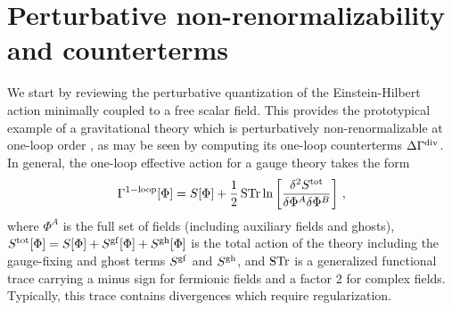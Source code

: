 \documentclass[preprint,preprintnumbers,amsmath,amssymb,nofootinbib,APS]{revtex4}
\newcommand{\be}{\begin{equation}}
\newcommand{\ee}{\end{equation}}
\newcommand{\2}{\sqrt{2\,}}
\begin{document}
\section{Perturbative non-renormalizability and counterterms}
\label{sec:pert}
We start by reviewing the perturbative quantization of the Einstein-Hilbert action minimally coupled to a free scalar field. This provides the prototypical example of a gravitational theory which is perturbatively non-renormalizable at one-loop order \cite{'tHooft:1974bx}, as may be seen by computing its one-loop counterterms $\Delta\Gamma^{\rm div}$. In general, the one-loop effective action for a gauge theory takes the form
%
\be\label{1l}
\Gamma^{\rm 1-loop}[\Phi] = S[\Phi] + \frac{1}{2} \, {\rm STr} \ln \left[ \frac{\delta^2 S^{\rm tot}}{\delta \Phi^A \delta \Phi^B} \right] \, , 
\ee
%
where $\Phi^A$ is the full set of fields (including auxiliary fields and ghosts), $S^{\rm tot}[\Phi] = S[\Phi] + S^{\rm gf}[\Phi] + S^{\rm gh}[\Phi]$ is the total action of the theory including the gauge-fixing and ghost terms $S^{\rm gf}$ and $S^{\rm gh}$, and ${\rm STr}$ is a generalized functional trace carrying a minus sign for fermionic fields and a factor 2 for complex fields. Typically, this trace contains divergences which require regularization.
\end{document}
